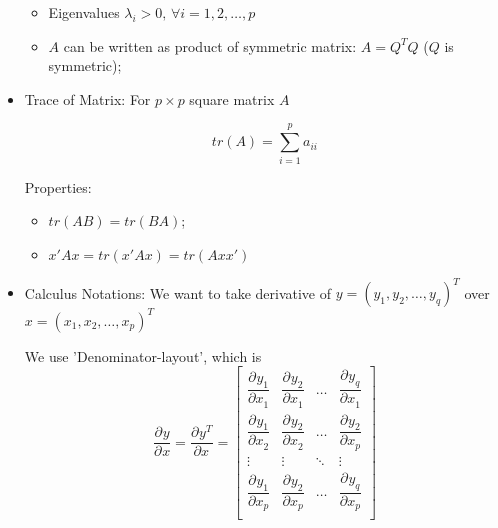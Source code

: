\begin{itemize}[topsep=6pt,itemsep=4pt]
\begin{itemize}[topsep=6pt,itemsep=4pt]
            
            \item Eigenvalues $ \lambda _i>0,\,\forall i=1,2,\ldots,p $
            \item $ A $ can be written as product of symmetric matrix: $ A= Q^TQ$ ($ Q $ is symmetric);
        \end{itemize}

        \item Trace of Matrix: For $ p\times p $ square matrix $ A $
            
            \[
                tr(A) =\sum_{i=1}^p a_{ii}
            \]
            
            Properties:
            \begin{itemize}[topsep=2pt,itemsep=2pt]
                \item $ tr(AB)=tr(BA)  $;
                \item $ x'Ax=tr(x'Ax)=tr(Axx') $
            \end{itemize}
            
                
            
                
            
                       
        \item Calculus Notations: We want to take derivative of $ y=(y_1,y_2,\ldots,y_q)^T $ over $ x=(x_1,x_2,\ldots,x_p)^T $
        
        We use 'Denominator-layout', which is
        \[
            \dfrac{\partial^{}y }{\partial ^{}x}=\dfrac{\partial^{} y^T}{\partial x^{}} =
            \begin{bmatrix}
            \dfrac{\partial^{} y_1}{\partial x_1 ^{}}&\dfrac{\partial^{} y_2}{\partial x_1 ^{}}&\ldots&\dfrac{\partial^{} y_q}{\partial x_1 ^{}}\\
            \dfrac{\partial^{} y_1}{\partial x_2 ^{}}&\dfrac{\partial^{} y_2}{\partial x_2 ^{}}&\ldots&\dfrac{\partial^{} y_2}{\partial x_p ^{}}\\
            \vdots&\vdots&\ddots&\vdots\\
            \dfrac{\partial^{} y_1}{\partial x_p ^{}}&\dfrac{\partial^{} y_2}{\partial x_p ^{}}&\ldots&\dfrac{\partial^{} y_q}{\partial x_p ^{}}\\
            \end{bmatrix}
        \]
        

\end{itemize}
